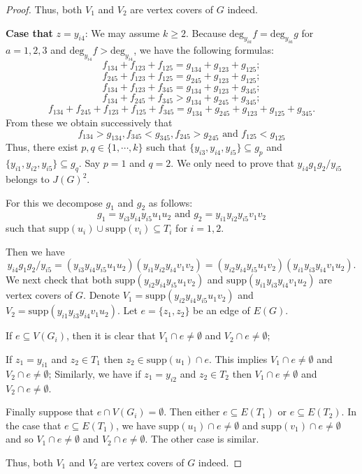\documentclass[12pt]{amsart}
\begin{document}
\begin{proof}
 Thus, both $V_1$ and $V_2$ are vertex covers of $G$ indeed.
 \vspace{2mm}

 {\bf  Case that} $z=y_{i4}$: We may assume $k\geq2$.  Because  $\mathrm{deg}_{y_{ia}}f=\mathrm{deg}_{y_{ia}}g$ for $a=1,2,3$  and $\mathrm{deg}_{y_{i4}}f>\mathrm{deg}_{y_{i4}}$,  we have the following formulas: $$f_{134}+f_{123}+f_{125}=g_{134}+g_{123}+g_{125};$$ $$f_{245}+f_{123}+f_{125}=g_{245}+g_{123}+g_{125};$$ $$f_{134}+f_{123}+f_{345}=g_{134}+g_{123}+g_{345};$$ $$f_{134}+f_{245}+f_{345}>g_{134}+g_{245}+g_{345};$$ $$f_{134}+f_{245}+f_{123}+f_{125}+f_{345}=g_{134}+g_{245}+g_{123}+g_{125}+g_{345}.$$
From these   we obtain successively that $$f_{134}>g_{134},f_{345}<g_{345},f_{245}>g_{245} \mbox{ and }f_{125}<g_{125}$$ Thus, there exist $p,q\in \{1,\cdots, k\}$ such that $\{y_{i3},y_{i4},y_{i5}\}\subseteq g_p$ and $\{y_{i1},y_{i2},y_{i5}\}\subseteq g_q$.  Say $p=1$ and $q=2$. We only need to prove that $y_{i4}g_1g_2/y_{i5}$ belongs to $J(G)^2$.

For this we  decompose $g_1$ and $g_2$ as follows: $$g_1=y_{i3}y_{i4}y_{i5}u_1u_2 \mbox{ and }g_2=y_{i1}y_{i2}y_{i5}v_1v_2 $$ such that  $\mathrm{supp}(u_i)\cup\mathrm{supp}(v_i)\subseteq T_i$  for $i=1,2$.


 Then we have $$y_{i4}g_1g_2/y_{i5}=(y_{i3}y_{i4}y_{i5}u_1u_2)(y_{i1}y_{i2}y_{i4}v_1v_2)=(y_{i2}y_{i4}y_{i5}u_1v_2)(y_{i1}y_{i3}y_{i4}v_1u_2).$$ We next check  that both $\mathrm{supp}(y_{i2}y_{i4}y_{i5}u_1v_2)$ and $\mathrm{supp}(y_{i1}y_{i3}y_{i4}v_1u_2)$ are vertex covers of $G$.
 Denote $V_1=\mathrm{supp}(y_{i2}y_{i4}y_{i5}u_1v_2)$ and $V_2=\mathrm{supp}(y_{i1}y_{i3}y_{i4}v_1u_2)$. Let $e=\{z_1,z_2\}$ be an edge of $E(G)$.



 If $e\subseteq V(G_i)$, then it is clear that $V_1\cap e\neq \emptyset$ and $V_2\cap e\neq \emptyset$;

  If $z_1=y_{i1}$ and $z_2\in T_1$ then $z_2\in \mathrm{supp}(u_1)\cap e$. This  implies $V_1\cap e\neq \emptyset$ and $V_2\cap e\neq \emptyset$; Similarly, we have if $z_1=y_{i2}$ and  $z_2\in T_2$ then $V_1\cap e\neq \emptyset$ and $V_2\cap e\neq \emptyset$.


 Finally  suppose that $e\cap V(G_i)=\emptyset$. Then either $e\subseteq  E(T_1)$ or $e\subseteq E(T_2)$. In the case that $e\subseteq  E(T_1)$, we have $\mathrm{supp}{(u_1)}\cap e\neq \emptyset$ and $\mathrm{supp}{(v_1)}\cap e\neq \emptyset$  and so  $V_1\cap e\neq \emptyset$ and $V_2\cap e\neq \emptyset$. The other case is similar.

  Thus, both $V_1$ and $V_2$ are vertex covers of $G$ indeed.
\end{proof}
\end{document}
